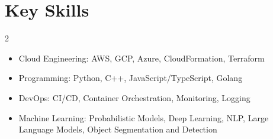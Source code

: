 \setlength{\multicolsep}{0.0pt plus 0pt minus 0pt}
\section{Key Skills}
  \begin{multicols}{2} 
    \begin{itemize}[noitemsep]
      \item Cloud Engineering: AWS, GCP, Azure, CloudFormation, Terraform
      \item Programming: Python, C++, JavaScript/TypeScript, Golang
      \item DevOps: CI/CD, Container Orchestration, Monitoring, Logging
      \item Machine Learning: Probabilistic Models, Deep Learning, NLP, Large Language Models, Object Segmentation and Detection
    \end{itemize}
  \end{multicols}